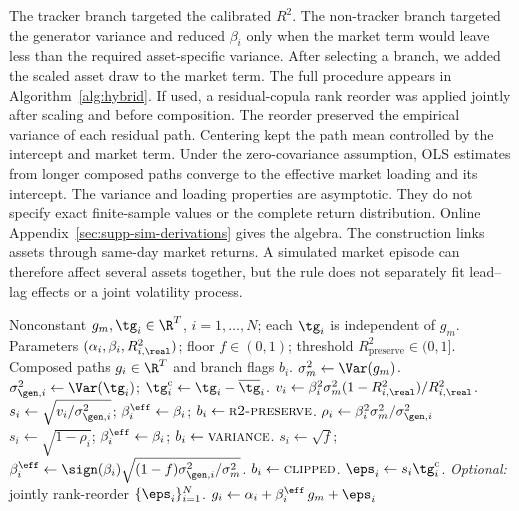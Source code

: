The tracker branch targeted the calibrated $R^2$. The non-tracker
branch targeted the generator variance and reduced $\beta_i$ only when
the market term would leave less than the required asset-specific
variance. After selecting a branch, we added the scaled asset draw to
the market term. The full procedure appears in
Algorithm~\ref{alg:hybrid}. If used, a residual-copula rank reorder was
applied jointly after scaling and before composition. The reorder
preserved the empirical variance of each residual path.
Centering kept the path mean controlled by the intercept and market
term. Under the zero-covariance assumption, OLS estimates from longer
composed paths converge to the effective market loading and its
intercept. The variance and loading properties are asymptotic. They
do not specify exact finite-sample values or the complete return
distribution. Online Appendix~\ref{sec:supp-sim-derivations} gives the algebra. The
construction links assets through same-day market returns. A simulated
market episode can therefore affect several assets together, but the
rule does not separately fit lead--lag effects or a joint volatility
process.

\begin{algorithm}[t]
\caption{Hybrid single-index model (SIM) composition with variance correction.}
\label{alg:hybrid}
\small
\begin{algorithmic}[1]
  \REQUIRE Nonconstant $g_m,\tg_i\in\R^T$, $i=1,\dots,N$; each
    $\tg_i$ is independent of $g_m$.
  \REQUIRE Parameters $(\alpha_i,\beta_i,R^2_{i,\real})$; floor
    $f\in(0,1)$; threshold $R^2_{\mathrm{preserve}}\in(0,1]$.
  \ENSURE Composed paths $g_i\in\R^T$ and branch flags $b_i$.
  \STATE $\sigma_m^2 \gets \Var(g_m)$.
    \STATE $\sigma_{\gen,i}^2 \gets \Var(\tg_i)$;
      $\tg_i^{\mathrm c} \gets \tg_i-\overline{\tg}_i$.
      \STATE $v_i \gets \beta_i^2\sigma_m^2(1-R^2_{i,\real})/R^2_{i,\real}$.
      \STATE $s_i \gets \sqrt{v_i/\sigma_{\gen,i}^2}$;
        $\beta_i^{\eff} \gets \beta_i$; $b_i\gets\textsc{r2-preserve}$.
    \ELSE
      \STATE $\rho_i \gets \beta_i^2 \sigma_m^2 / \sigma_{\gen,i}^2$
        \STATE $s_i \gets \sqrt{1-\rho_i}$;
          $\beta_i^{\eff}\gets\beta_i$; $b_i\gets\textsc{variance}$.
      \ELSE
        \STATE $s_i\gets\sqrt{f}$;
          $\beta_i^{\eff}\gets\sign(\beta_i)
          \sqrt{(1-f)\sigma_{\gen,i}^2/\sigma_m^2}$.
        \STATE $b_i\gets\textsc{clipped}$.
      \ENDIF
    \ENDIF
    \STATE $\eps_i \gets s_i\tg_i^{\mathrm c}$.
  \ENDFOR
  \STATE \textit{Optional:} jointly rank-reorder $\{\eps_i\}_{i=1}^{N}$.
    \STATE $g_i \gets \alpha_i + \beta_i^{\eff}\, g_m + \eps_i$
      \hfill {}
  \ENDFOR
\end{algorithmic}
\end{algorithm}

